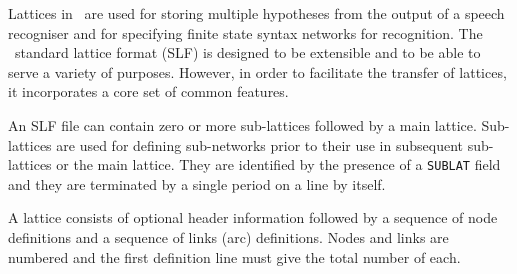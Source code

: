 %
%



Lattices in \HTK\ are used for storing 
multiple hypotheses from the
output of a speech recogniser and for specifying finite state syntax
networks for recognition.  The \HTK\ standard lattice format (SLF) is
designed to be extensible and to be able to serve a variety of
purposes.  However, in order to facilitate the transfer of 
lattices,
it incorporates a core set of common features.

An SLF file can contain zero or more sub-lattices 
followed by a main
lattice.  Sub-lattices are used for defining sub-networks prior to
their use in subsequent sub-lattices or the main lattice.  They are
identified by the presence of a \texttt{SUBLAT} field and they are
terminated by a single period on a line by itself.

A  lattice consists of optional header information followed by a
sequence of node definitions and a sequence of links (arc) definitions.
Nodes and links are numbered and the first definition line must give
the total number of each.

